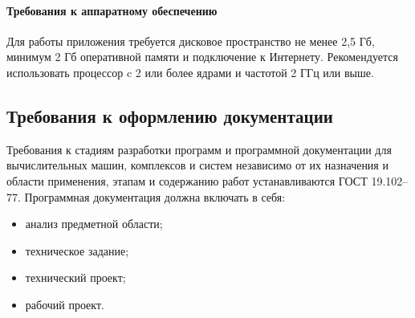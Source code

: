 \paragraph{Требования к аппаратному обеспечению}
Для работы приложения требуется дисковое пространство не менее 2,5 Гб, минимум 2 Гб оперативной памяти и подключение к Интернету. Рекомендуется использовать процессор c 2 или более ядрами и частотой 2 ГГц или выше.

\subsection{Требования к оформлению документации}
Требования к стадиям разработки программ и программной документации для вычислительных машин, комплексов и систем независимо от их назначения и области применения, этапам и содержанию работ устанавливаются ГОСТ 19.102–77. 
Программная документация должна включать в себя: 
\begin{itemize}
	\item анализ предметной области;
	\item техническое задание;
	\item технический проект;
	\item рабочий проект.
\end{itemize}
